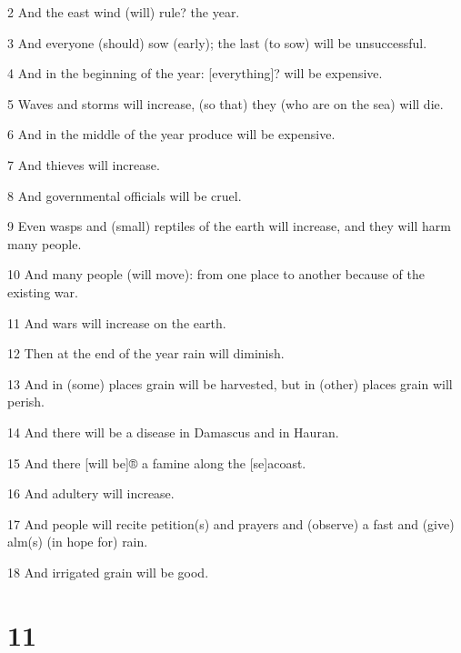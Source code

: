 \par 2 And the east wind (will) rule? the year. 

\par 3 And everyone (should) sow (early); the last (to sow) will be unsuccessful. 

\par 4 And in the beginning of the year: [everything]? will be expensive. 

\par 5 Waves and storms will increase, (so that) they (who are on the sea) will die. 

\par 6 And in the middle of the year produce will be expensive. 

\par 7 And thieves will increase. 

\par 8 And governmental officials will be cruel. 

\par 9 Even wasps and (small) reptiles of the earth will increase, and they will harm many people. 

\par 10 And many people (will move): from one place to another because of the existing war. 

\par 11 And wars will increase on the earth. 

\par 12 Then at the end of the year rain will diminish. 

\par 13 And in (some) places grain will be harvested, but in (other) places grain will perish. 

\par 14 And there will be a disease in Damascus and in Hauran. 

\par 15 And there [will be]® a famine along the [se]acoast. 

\par 16 And adultery will increase. 

\par 17 And people will recite petition(s) and prayers and (observe) a fast and (give) alm(s) (in hope for) rain. 

\par 18 And irrigated grain will be good. 

\chapter{11}

